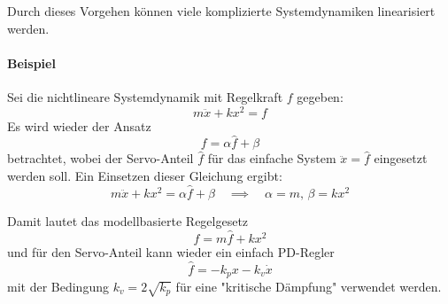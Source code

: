 \documentclass[a4paper, 11pt, accentcolor = tud3b]{tudreport}
\begin{document}
				Durch dieses Vorgehen können viele komplizierte Systemdynamiken linearisiert werden.
				
				\paragraph{Beispiel}
					Sei die nichtlineare Systemdynamik mit Regelkraft \(f\) gegeben:
					\begin{equation*}
						m\ddot{x} + kx^2 = f
					\end{equation*}
					Es wird wieder der Ansatz
					\begin{equation*}
						f = \alpha \hat{f} + \beta
					\end{equation*}
					betrachtet, wobei der Servo-Anteil \( \hat{f} \) für das einfache System \( \ddot{x} = \hat{f} \) eingesetzt werden soll. Ein Einsetzen dieser Gleichung ergibt:
					\begin{equation*}
						m\ddot{x} + kx^2 = \alpha \hat{f} + \beta \quad\implies\quad \alpha = m,\, \beta = kx^2
					\end{equation*}
					
					Damit lautet das modellbasierte Regelgesetz
					\begin{equation*}
						f = m \hat{f} + kx^2
					\end{equation*}
					und für den Servo-Anteil kann wieder ein einfach PD-Regler
					\begin{equation*}
						\hat{f} = -k_p x - k_v \dot{x}
					\end{equation*}
					mit der Bedingung \( k_v = 2 \sqrt{k_p} \) für eine "kritische Dämpfung" verwendet werden.
\end{document}
